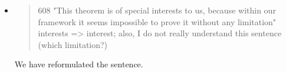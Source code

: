 \begin{itemize}






  \item \begin{quote}
608 "This theorem is of special interests to us, because within our framework it seems impossible to prove it without any limitation" interests => interest; also, I do not really understand this sentence (which limitation?)
\end{quote}
  \Mark We have reformulated the sentence. 



\end{itemize}
